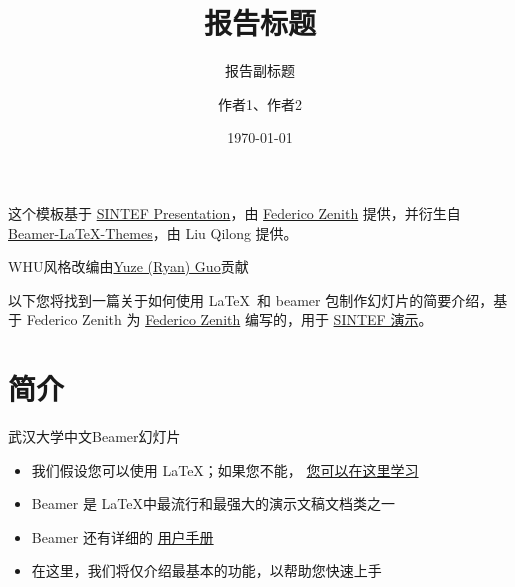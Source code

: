 \documentclass{beamer}
\title{报告标题}
\subtitle{报告副标题}
\author{作者1、作者2}
\date{\today}
\newcommand{\hrefcol}[2]{\textcolor{cyan}{\href{#1}{#2}}}
\begin{document}
\maketitle



\begin{frame}

这个模板基于 \hrefcol{https://www.overleaf.com/latex/templates/sintef-presentation/jhbhdffczpnx}{SINTEF Presentation}，由 \hrefcol{mailto:federico.zenith@sintef.no}{Federico Zenith} 提供，并衍生自 \hrefcol{https://github.com/TOB-KNPOB/Beamer-LaTeX-Themes}{Beamer-LaTeX-Themes}，由 Liu Qilong 提供。

\vspace{\baselineskip}

WHU风格改编由\hrefcol{https://ryan-gwo.github.io}{Yuze (Ryan) Guo}贡献

\vspace{\baselineskip}

以下您将找到一篇关于如何使用 \LaTeX\ 和 beamer 包制作幻灯片的简要介绍，基于 Federico Zenith 为 \hrefcol{mailto:federico.zenith@sintef.no}{Federico Zenith} 编写的，用于 \hrefcol{https://www.overleaf.com/latex/templates/sintef-presentation/jhbhdffczpnx}{SINTEF 演示}。



\end{frame}

\section{简介}

\begin{frame}{武汉大学中文Beamer幻灯片}
\begin{itemize}
\item 我们假设您可以使用 \LaTeX；如果您不能，
\hrefcol{http://en.wikibooks.org/wiki/LaTeX/}{您可以在这里学习}
\item Beamer 是 \LaTeX 中最流行和最强大的演示文稿文档类之一
\item Beamer 还有详细的
\hrefcol{http://www.ctan.org/tex-archive/macros/latex/contrib/beamer/doc/beameruserguide.pdf}{用户手册}
\item 在这里，我们将仅介绍最基本的功能，以帮助您快速上手
\end{itemize}
\end{frame}
\end{document}
